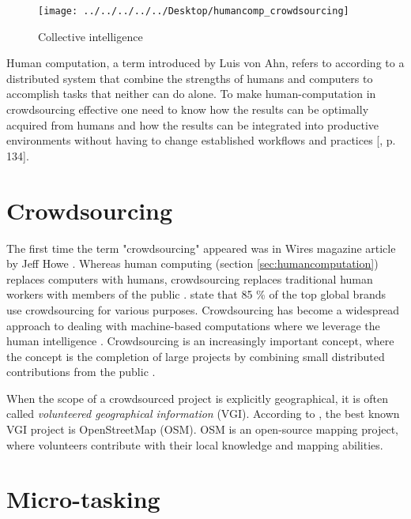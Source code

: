 \begin{figure}[H]
	\centering
	\texttt{[image: ../../../../../Desktop/humancomp\_crowdsourcing]}
	\caption{Collective intelligence \citep{Quinn2011}}
	\label{fig:humancompcrowdsourcing}
\end{figure}

Human computation, a term introduced by Luis von Ahn, refers to according to \cite{Quinn2011} a distributed system that combine the strengths of humans and computers to accomplish tasks that neither can do alone. To make human-computation in crowdsourcing effective one need to know how the results can be optimally acquired from humans and how the results can be integrated into productive environments without having to change established workflows and practices [\citep{Meier2013}, p. 134]. 

\section{Crowdsourcing}\label{sec:crowdsourcing}

The first time the term "crowdsourcing" appeared was in Wires magazine article by Jeff Howe \citep{Howe2006}. Whereas human computing (section \ref{sec:humancomputation}) replaces computers with humans, crowdsourcing replaces traditional human workers with members of the public \citep{Quinn2011}. \cite{EYeka2015} state that 85 \% of the top global brands use crowdsourcing for various purposes. Crowdsourcing has become a widespread approach to dealing with machine-based computations where we leverage the human intelligence \citep{Gadiraju2015}. Crowdsourcing is an increasingly important concept, where the concept is the completion of large projects by combining small distributed contributions from the public \citep{Salk2016}. 

When the scope of a crowdsourced project is explicitly geographical, it is often called \textit{volunteered geographical information} (VGI). According to \cite{Salk2016}, the best known VGI project is OpenStreetMap (OSM). OSM is an open-source mapping project, where volunteers contribute with their local knowledge and mapping abilities. 

\section{Micro-tasking}\label{sec:microtasking}

